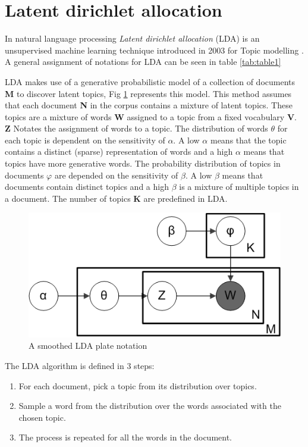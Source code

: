 \section{Latent dirichlet allocation}
In natural language processing \textit{Latent dirichlet allocation} (LDA) is an unsupervised machine learning technique introduced in 2003 for Topic modelling \cite{Blei2003LatentAllocation}. A general assignment of notations for LDA can be seen in table \ref{tab:table1}

LDA makes use of a generative probabilistic model of a collection of documents \textbf{M} to discover latent topics, Fig \ref{fig:LDA} represents this model. This method assumes that each document \textbf{N} in the corpus contains a mixture of latent topics. These topics are a mixture of words \textbf{W} assigned to a topic from a fixed vocabulary \textbf{V}. \textbf{Z} Notates the assignment of words to a topic. The distribution of words $\theta$ for each topic is dependent on the sensitivity of $\alpha$. A low $\alpha$ means that the topic contains a distinct (sparse) representation of words and a high $\alpha$ means that topics have more generative words. The probability distribution of topics in documents $\varphi$ are depended on the sensitivity of $\beta$. A low $\beta$ means that documents contain distinct topics and a high $\beta$ is a mixture of multiple topics in a document. The number of topics \textbf{K} are predefined in LDA. 

\begin{figure}
    \centering
    \includegraphics[h]{methodology/Smoothed_LDA.png}
    \caption{A smoothed LDA plate notation}
    \label{fig:LDA}
\end{figure}

The LDA algorithm is defined in 3 steps:
\begin{enumerate}
    \item For each document, pick a topic from its distribution over topics.
    \item Sample a word from the distribution over the words associated with the chosen topic. 
    \item  The process is repeated for all the words in the document.
\end{enumerate}

